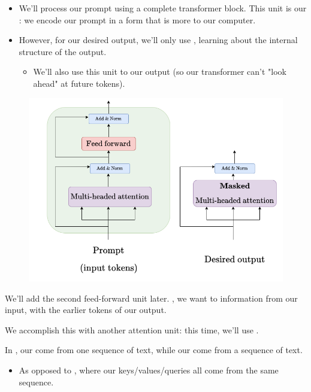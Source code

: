         \begin{itemize}
            \item We'll process our prompt using a complete transformer block. This unit is our : we encode our prompt in a form that is more  to our computer.

            \item However, for our desired output, we'll only use , learning about the internal structure of the output.
            
                \begin{itemize}
                    \item We'll also use this unit to  our output (so our transformer can't "look ahead" at future tokens).
                \end{itemize}
        \end{itemize}

        \begin{figure}[H]
            \centering
            \includegraphics[width=0.6\linewidth]{images/transformers_images/attention_heads_encoder_decoder.png}
        \end{figure}

        We'll add the second feed-forward unit later. , we want to  information from our input, with the earlier tokens of our output.

        We accomplish this with another attention unit: this time, we'll use .\\

        \begin{definition}
            In , our  come from one sequence of text, while our  come from a  sequence of text.

            \begin{itemize}
                \item As opposed to , where our keys/values/queries all come from the same sequence.
            \end{itemize}
        \end{definition}

